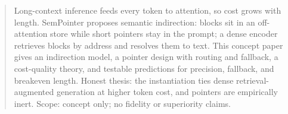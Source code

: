 \begin{abstract}
Long-context inference feeds every token to attention, so cost grows with length. SemPointer proposes semantic indirection: blocks sit in an off-attention store while short pointers stay in the prompt; a dense encoder retrieves blocks by address and resolves them to text. This concept paper gives an indirection model, a pointer design with routing and fallback, a cost-quality theory, and testable predictions for precision, fallback, and breakeven length. Honest thesis: the instantiation ties dense retrieval-augmented generation at higher token cost, and pointers are empirically inert. Scope: concept only; no fidelity or superiority claims.
\end{abstract}
